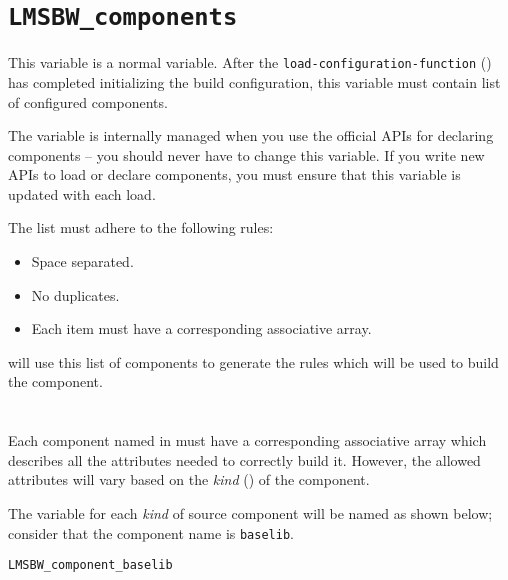 \section{\texttt{LMSBW\_components}}\label{variables:lmsbw-components}

This variable is a normal \make variable.  After the
\texttt{load-configuration-function}
() has completed
initializing the build configuration, this variable must contain list
of configured components.

The variable is internally managed when you use the official APIs for
declaring components -- you should never have to change this variable.
If you write new APIs to load or declare components, you must ensure
that this variable is updated with each load.

The list must adhere to the following rules:

\begin{itemize}
\item Space separated.
\item No duplicates.
\item Each item must have a corresponding 
  associative array.
\end{itemize}

\lmsbw will use this list of components to generate the rules which
will be used to build the component.

\section{}\label{variables:lmsbw-component-component}

Each component named in \lmsbwcomponents must have a corresponding
associative array which describes all the attributes needed to
correctly build it.  However, the allowed attributes will vary based
on the \emph{kind} () of the component.

The \make variable for each \emph{kind} of source component will be
named as shown below; consider that the component name is \texttt{baselib}.

\begin{verbatim}
LMSBW_component_baselib
\end{verbatim}

